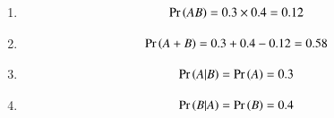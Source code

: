 \begin{enumerate}
\item 
\begin{align}
\Pr\left(AB\right) =  0.3 \times 0.4 = 0.12
\end{align}
%
\item 
%
\begin{align}
\Pr\left(A+B\right)  
 = 0.3 + 0.4 - 0.12 = 0.58
\end{align}
%
\item 
\begin{align}
\Pr\left(A|B\right) = \Pr\left(A\right)
= 0.3
\end{align}
%
\item 
\begin{align}
\Pr\left(B|A\right) =  \Pr\left(B\right) = 0.4
\end{align}
\end{enumerate}
